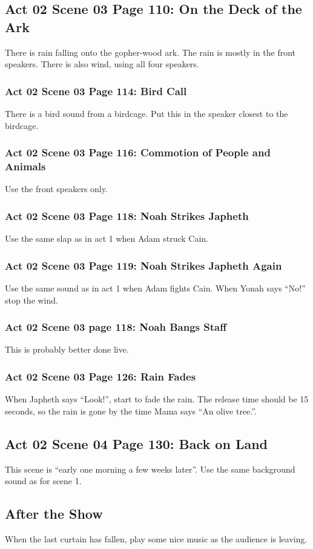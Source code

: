 \documentclass[letterpaper,twoside]{article}
\begin{document}
\subsection{Act 02 Scene 03 Page 110: On the Deck of the Ark}
There is rain falling onto the gopher-wood ark.
The rain is mostly in the front speakers.
There is also wind, using all four speakers.
\subsubsection{Act 02 Scene 03 Page 114: Bird Call}
There is a bird sound from a birdcage.  Put this in the speaker
closest to the birdcage.
\subsubsection{Act 02 Scene 03 Page 116: Commotion of People and Animals}
Use the front speakers only.
\subsubsection{Act 02 Scene 03 Page 118: Noah Strikes Japheth}
Use the same slap as in act 1 when Adam struck Cain.
\subsubsection{Act 02 Scene 03 Page 119: Noah Strikes Japheth Again}
Use the same sound as in act 1 when Adam fights Cain.
When Yonah says ``No!'' stop the wind.
\subsubsection{Act 02 Scene 03 page 118: Noah Bangs Staff}
This is probably better done live.
\subsubsection{Act 02 Scene 03 Page 126: Rain Fades}
When Japheth says ``Look!'', start to fade the rain.
The release time should be 15 seconds, so the rain is gone
by the time Mama says ``An olive tree.''.
\subsection{Act 02 Scene 04 Page 130: Back on Land}
This scene is ``early one morning a few weeks later''.
Use the same background sound as for scene 1.
\subsection{After the Show}
When the last curtain has fallen, play some nice music as the audience
is leaving.
\end{document}
